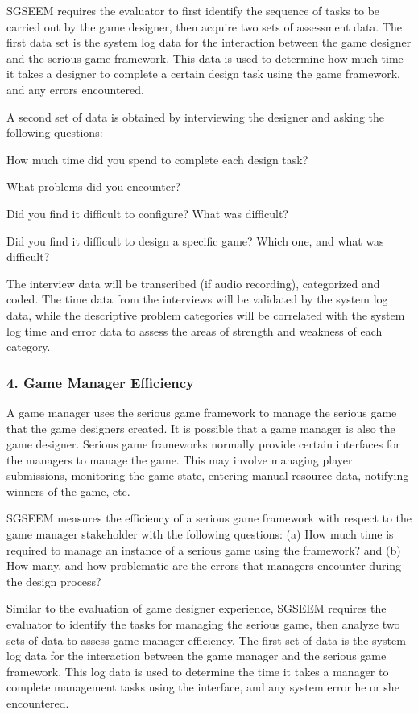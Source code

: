 \documentclass{sigchi}
\begin{document}
SGSEEM requires the evaluator to first identify the sequence of tasks to be carried out by
the game designer, then acquire two sets of assessment data.
The first data set is the system log data for the interaction between the game designer
and the serious game framework. This data is used to determine how much
time it takes a designer to complete a certain design task using the game
framework, and any errors encountered. 

A second set of data is obtained by interviewing the designer and asking the following questions:
\begin{compactitem}
\item How much time did you spend to complete each design task?
\item What problems did you encounter?
\item Did you find it difficult to configure? What was difficult?
\item Did you find it difficult to design a specific game? Which one, and what was difficult?
\end{compactitem}

The interview data will be transcribed (if audio recording), categorized and coded. The time
data from the interviews will be validated by the system log data, while the descriptive problem
categories will be correlated with the system log time and error data to assess the areas of
strength and weakness of each category.

\subsubsection{4. Game Manager Efficiency}

A game manager uses the serious game framework to manage the serious game that the game
designers created. It is possible that a game manager is also the game designer.
Serious game frameworks normally provide certain interfaces for the managers to manage the
game. This may involve managing player submissions, monitoring the game state, entering
manual resource data, notifying winners of the game, etc.

SGSEEM measures the efficiency of a serious game framework with respect to the game
manager stakeholder with the following questions: (a) How much time is
required to manage an instance of a serious game using the framework? and (b) How many,
and how problematic are the errors that managers encounter during the design process?

Similar to the evaluation of game designer experience, SGSEEM requires the evaluator to
identify the tasks for managing the serious game, then
analyze two sets of data to assess game manager efficiency. The
first set of data is the system log data for the interaction between
the game manager and the serious game framework. This log data is used to
determine the time it takes a manager to complete
management tasks using the interface, and any system error he or she
encountered. 
\end{document}
